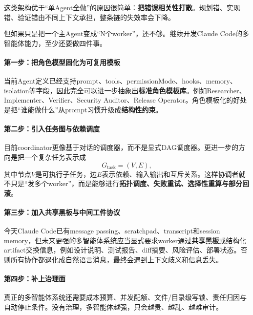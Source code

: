 \documentclass[12pt,a4paper]{article}
\begin{document}
这类架构优于“单Agent全做”的原因很简单：\textbf{把错误相关性打散}。规划错、实现错、验证错由不同上下文承担，整条链的失效率会下降。

但如果只是把一个主Agent变成“N个worker”，还不够。继续开发Claude Code的多智能体能力，至少还要做四件事。

\paragraph{第一步：把角色模型固化为可复用模板}

当前Agent定义已经支持prompt、tools、permissionMode、hooks、memory、isolation等字段，因此完全可以进一步抽象出\textbf{标准角色模板库}。例如Researcher、Implementer、Verifier、Security Auditor、Release Operator。角色模板化的好处是把“谁能做什么”从prompt习惯升级成\textbf{结构性约束}。

\paragraph{第二步：引入任务图与依赖调度}

目前coordinator更像基于对话的调度器，而不是显式DAG调度器。更进一步的方向是把一个复杂任务表示成
\begin{equation}
G_{\text{task}} = (V, E),
\end{equation}
其中节点$V$是可执行子任务，边$E$表示依赖、输入输出和互斥关系。这样协调者就不只是“发多个worker”，而是能够进行\textbf{拓扑调度、失败重试、选择性重算与部分回滚}。

\paragraph{第三步：加入共享黑板与中间工件协议}

今天Claude Code已有message passing、scratchpad、transcript和session memory，但未来更强的多智能体系统应当显式要求worker通过\textbf{共享黑板}或结构化artifact交换信息，例如设计说明、测试报告、diff摘要、风险评估、部署状态。否则所有协作都退化成自然语言消息，最终会遇到上下文歧义和信息丢失。

\paragraph{第四步：补上治理面}

真正的多智能体系统还需要成本预算、并发配额、文件/目录级写锁、责任归因与自动停止条件。没有治理，多智能体越强，只会越贵、越乱、越难审计。
\end{document}
